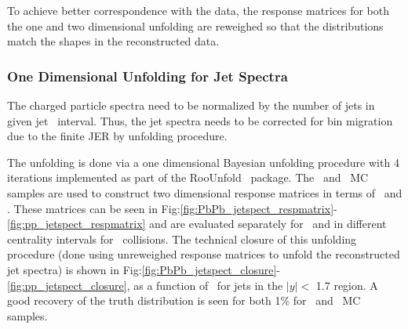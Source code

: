  To achieve better correspondence with the data, the response matrices for both the one and two dimensional unfolding are reweighed so that the distributions match the shapes in the reconstructed data.
 

\subsubsection{One Dimensional Unfolding for Jet Spectra}
\label{sec:1dunfolding}
The charged particle spectra need to be normalized by the number of jets in given jet \pt\ interval.
Thus, the jet spectra needs to be corrected for bin migration due to the finite JER by unfolding procedure.


The unfolding is done via a one dimensional Bayesian unfolding procedure with 4 iterations implemented as part of the RooUnfold~\cite{Adye:2011gm} package.
The \pp\ and \PbPb\ MC samples are used to construct two dimensional response matrices in terms of \ptjettruth\ and \ptjetreco.
These matrices can be seen in Fig:\ref{fig:PbPb_jetspect_respmatrix}-\ref{fig:pp_jetspect_respmatrix} and are evaluated separately for \pp\ and in different centrality intervals for \PbPb\ collisions.
The technical closure of this unfolding procedure (done using unreweighed response matrices to unfold the reconstructed jet spectra) is shown in Fig:\ref{fig:PbPb_jetspect_closure}-\ref{fig:pp_jetspect_closure}, as a function of \ptjet\ for jets in the $|y| < $ 1.7 region.
A good recovery of the truth distribution is seen for both 1\% for \pbpb\ and \pp\ MC samples.

